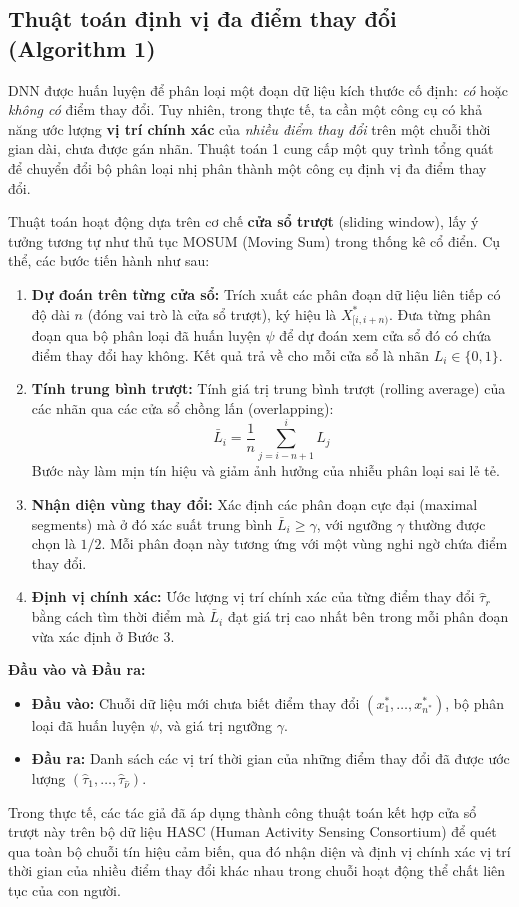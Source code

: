 \subsection{Thuật toán định vị đa điểm thay đổi (Algorithm 1)}
DNN được huấn luyện để phân loại một đoạn dữ liệu kích thước cố định: \textit{có} hoặc \textit{không có} 
điểm thay đổi. Tuy nhiên, trong thực tế, ta cần một công cụ có khả năng ước lượng 
\textbf{vị trí chính xác} của \textit{nhiều điểm thay đổi} trên một chuỗi thời gian dài, 
chưa được gán nhãn. Thuật toán 1 cung cấp một quy trình tổng quát để chuyển đổi bộ phân loại nhị phân 
thành một công cụ định vị đa điểm thay đổi.

Thuật toán hoạt động dựa trên cơ chế \textbf{cửa sổ trượt} (sliding window), 
lấy ý tưởng tương tự như thủ tục MOSUM (Moving Sum) trong thống kê cổ điển. Cụ thể, các bước tiến hành như sau:

\begin{enumerate}
    \item \textbf{Dự đoán trên từng cửa sổ:} Trích xuất các phân đoạn dữ liệu liên tiếp có độ dài $n$ (đóng vai trò là cửa sổ trượt), ký hiệu là $X^*_{[i, i+n)}$. 
    Đưa từng phân đoạn qua bộ phân loại đã huấn luyện $\psi$ để dự đoán xem cửa sổ đó có chứa điểm thay đổi hay không. 
    Kết quả trả về cho mỗi cửa sổ là nhãn $L_i \in \{0, 1\}$.

    \item \textbf{Tính trung bình trượt:} Tính giá trị trung bình trượt (rolling average) của các nhãn qua các cửa sổ chồng lấn (overlapping):
    \[
        \bar{L}_i = \frac{1}{n} \sum_{j=i-n+1}^{i} L_j
    \]
    Bước này làm mịn tín hiệu và giảm ảnh hưởng của nhiễu phân loại sai lẻ tẻ.

    \item \textbf{Nhận diện vùng thay đổi:} Xác định các phân đoạn cực đại (maximal segments) mà ở đó xác suất 
    trung bình $\bar{L}_i \ge \gamma$, với ngưỡng $\gamma$ thường được chọn là $1/2$. 
    Mỗi phân đoạn này tương ứng với một vùng nghi ngờ chứa điểm thay đổi.

    \item \textbf{Định vị chính xác:} Ước lượng vị trí chính xác của từng điểm thay đổi $\hat{\tau}_r$ bằng cách 
    tìm thời điểm mà $\bar{L}_i$ đạt giá trị cao nhất bên trong mỗi phân đoạn vừa xác định ở Bước 3.
\end{enumerate}

\textbf{Đầu vào và Đầu ra:}
\begin{itemize}
    \item \textbf{Đầu vào:} Chuỗi dữ liệu mới chưa biết điểm thay đổi $(x_1^*, \ldots, x_{n^*}^*)$, 
    bộ phân loại đã huấn luyện $\psi$, và giá trị ngưỡng $\gamma$.
    \item \textbf{Đầu ra:} Danh sách các vị trí thời gian của những điểm thay đổi đã được ước 
    lượng $(\hat{\tau}_1, \ldots, \hat{\tau}_{\hat{\nu}})$.
\end{itemize}

Trong thực tế, các tác giả đã áp dụng thành công thuật toán kết hợp cửa sổ trượt này trên bộ dữ liệu HASC 
(Human Activity Sensing Consortium) để quét qua toàn bộ chuỗi tín hiệu cảm biến, 
qua đó nhận diện và định vị chính xác vị trí thời gian của nhiều điểm thay đổi khác 
nhau trong chuỗi hoạt động thể chất liên tục của con người.
